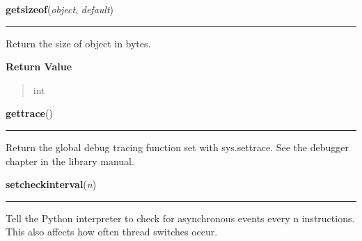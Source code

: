 \hspace{.8\funcindent}\begin{boxedminipage}{\funcwidth}

    \raggedright \textbf{getsizeof}(\textit{object}, \textit{default})

    \vspace{-1.5ex}

    \rule{\textwidth}{0.5\fboxrule}
\setlength{\parskip}{2ex}
    Return the size of object in bytes.

\setlength{\parskip}{1ex}
      \textbf{Return Value}
    \vspace{-1ex}

      \begin{quote}
      int

      \end{quote}

    \end{boxedminipage}

    \label{sys:gettrace}

    \vspace{0.5ex}

\hspace{.8\funcindent}\begin{boxedminipage}{\funcwidth}

    \raggedright \textbf{gettrace}()

    \vspace{-1.5ex}

    \rule{\textwidth}{0.5\fboxrule}
\setlength{\parskip}{2ex}
    Return the global debug tracing function set with sys.settrace. See the
    debugger chapter in the library manual.

\setlength{\parskip}{1ex}
    \end{boxedminipage}

    \label{sys:setcheckinterval}

    \vspace{0.5ex}

\hspace{.8\funcindent}\begin{boxedminipage}{\funcwidth}

    \raggedright \textbf{setcheckinterval}(\textit{n})

    \vspace{-1.5ex}

    \rule{\textwidth}{0.5\fboxrule}
\setlength{\parskip}{2ex}
    Tell the Python interpreter to check for asynchronous events every n 
    instructions.  This also affects how often thread switches occur.

\setlength{\parskip}{1ex}
    \end{boxedminipage}

